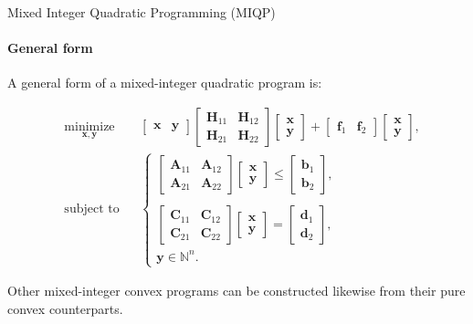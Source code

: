 \documentclass{beamer}
\begin{document}
\begin{frame}{Mixed Integer Quadratic Programming (MIQP)}
\framesubtitle{General form}
\begin{flushleft}

A general form of a mixed-integer quadratic program is:

%
\begin{equation} \label{QP}
\begin{aligned}
& \underset{\mathbf{x}, \mathbf{y}}{\text{minimize}}
& & 
\begin{bmatrix}
\mathbf{x} & \mathbf{y}
\end{bmatrix}
\begin{bmatrix}
\mathbf{H}_{11} & \mathbf{H}_{12} \\
\mathbf{H}_{21} & \mathbf{H}_{22}
\end{bmatrix} 
\begin{bmatrix}
\mathbf{x} \\
\mathbf{y}
\end{bmatrix} +
\begin{bmatrix}
\mathbf{f}_1 & \mathbf{f}_2
\end{bmatrix}
\begin{bmatrix}
\mathbf{x} \\
\mathbf{y}
\end{bmatrix}, \\
& \text{subject to}
& & \begin{cases} 
\begin{bmatrix}
\mathbf{A}_{11} & \mathbf{A}_{12} \\
\mathbf{A}_{21} & \mathbf{A}_{22}
\end{bmatrix} 
\begin{bmatrix}
\mathbf{x} \\
\mathbf{y}
\end{bmatrix}
\leq 
\begin{bmatrix}
\mathbf{b}_1 \\
\mathbf{b}_2
\end{bmatrix}, \\ 
\\
\begin{bmatrix}
\mathbf{C}_{11} & \mathbf{C}_{12} \\
\mathbf{C}_{21} & \mathbf{C}_{22}
\end{bmatrix} 
\begin{bmatrix}
\mathbf{x} \\
\mathbf{y}
\end{bmatrix} = 
\begin{bmatrix}
\mathbf{d}_1 \\
\mathbf{d}_2
\end{bmatrix},  \\
\mathbf{y} \in \mathbb{N}^n.
\end{cases}
%
\end{aligned}
\end{equation}
 
Other mixed-integer convex programs can be constructed likewise  from their pure convex counterparts.
 
\end{flushleft}
\end{frame}
\end{document}

